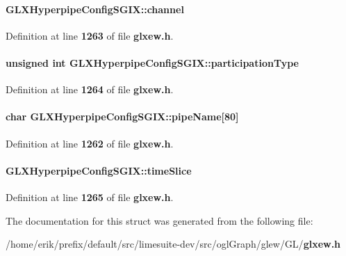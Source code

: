 \paragraph[{channel}]{ G\+L\+X\+Hyperpipe\+Config\+S\+G\+I\+X\+::channel}\label{structGLXHyperpipeConfigSGIX_abc812d8796ba89d5de4e33b3532d8335}


Definition at line {\bf 1263} of file {\bf glxew.\+h}.

\paragraph[{participation\+Type}]{\setlength{\rightskip}{0pt plus 5cm}unsigned {\bf int} G\+L\+X\+Hyperpipe\+Config\+S\+G\+I\+X\+::participation\+Type}\label{structGLXHyperpipeConfigSGIX_a093cfaaec305531f66e1120929b5b01b}


Definition at line {\bf 1264} of file {\bf glxew.\+h}.

\paragraph[{pipe\+Name}]{\setlength{\rightskip}{0pt plus 5cm}char G\+L\+X\+Hyperpipe\+Config\+S\+G\+I\+X\+::pipe\+Name[80]}\label{structGLXHyperpipeConfigSGIX_adbbd59b9e05c106f38f6fe769653be86}


Definition at line {\bf 1262} of file {\bf glxew.\+h}.

\paragraph[{time\+Slice}]{ G\+L\+X\+Hyperpipe\+Config\+S\+G\+I\+X\+::time\+Slice}\label{structGLXHyperpipeConfigSGIX_afe9288e75dc1ae5e0f33eff978d7024d}


Definition at line {\bf 1265} of file {\bf glxew.\+h}.



The documentation for this struct was generated from the following file\+:\begin{DoxyCompactItemize}
\item 
/home/erik/prefix/default/src/limesuite-\/dev/src/ogl\+Graph/glew/\+G\+L/{\bf glxew.\+h}\end{DoxyCompactItemize}
